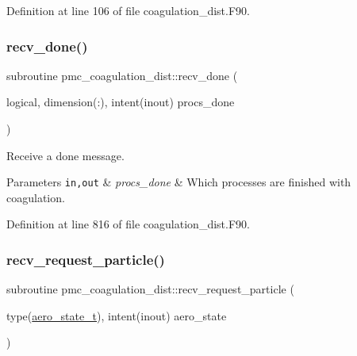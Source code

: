 Definition at line 106 of file coagulation\+\_\+dist.\+F90.

\mbox{\label{namespacepmc__coagulation__dist_aabf7ad0c151fc3f2bd7f9adad6791cc2}} 
\subsubsection{\texorpdfstring{recv\+\_\+done()}{recv\_done()}}
{\footnotesize\ttfamily subroutine pmc\+\_\+coagulation\+\_\+dist\+::recv\+\_\+done (\begin{DoxyParamCaption}\item[{logical, dimension(\+:), intent(inout)}]{procs\+\_\+done }\end{DoxyParamCaption})}



Receive a done message. 


\begin{DoxyParams}[1]{Parameters}
\mbox{\tt in,out}  & {\em procs\+\_\+done} & Which processes are finished with coagulation. \\
\hline
\end{DoxyParams}


Definition at line 816 of file coagulation\+\_\+dist.\+F90.

\mbox{\label{namespacepmc__coagulation__dist_addc40be25e3ef491aa13a10e628afbf9}} 
\subsubsection{\texorpdfstring{recv\+\_\+request\+\_\+particle()}{recv\_request\_particle()}}
{\footnotesize\ttfamily subroutine pmc\+\_\+coagulation\+\_\+dist\+::recv\+\_\+request\+\_\+particle (\begin{DoxyParamCaption}\item[{type(\mbox{\hyperlink{structpmc__aero__state_1_1aero__state__t}{aero\+\_\+state\+\_\+t}}), intent(inout)}]{aero\+\_\+state }\end{DoxyParamCaption})}


